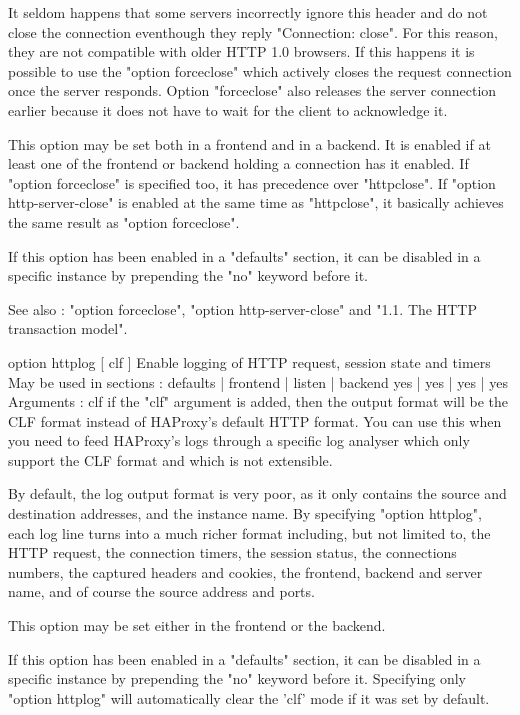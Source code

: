   It seldom happens that some servers incorrectly ignore this header and do not
  close the connection eventhough they reply "Connection: close". For this
  reason, they are not compatible with older HTTP 1.0 browsers. If this happens
  it is possible to use the "option forceclose" which actively closes the
  request connection once the server responds. Option "forceclose" also
  releases the server connection earlier because it does not have to wait for
  the client to acknowledge it.

  This option may be set both in a frontend and in a backend. It is enabled if
  at least one of the frontend or backend holding a connection has it enabled.
  If "option forceclose" is specified too, it has precedence over "httpclose".
  If "option http-server-close" is enabled at the same time as "httpclose", it
  basically achieves the same result as "option forceclose".

  If this option has been enabled in a "defaults" section, it can be disabled
  in a specific instance by prepending the "no" keyword before it.

  See also : "option forceclose", "option http-server-close" and
             "1.1. The HTTP transaction model".


option httplog [ clf ]
  Enable logging of HTTP request, session state and timers
  May be used in sections :   defaults | frontend | listen | backend
                                 yes   |    yes   |   yes  |   yes
  Arguments :
    clf       if the "clf" argument is added, then the output format will be
              the CLF format instead of HAProxy's default HTTP format. You can
              use this when you need to feed HAProxy's logs through a specific
              log analyser which only support the CLF format and which is not
              extensible.

  By default, the log output format is very poor, as it only contains the
  source and destination addresses, and the instance name. By specifying
  "option httplog", each log line turns into a much richer format including,
  but not limited to, the HTTP request, the connection timers, the session
  status, the connections numbers, the captured headers and cookies, the
  frontend, backend and server name, and of course the source address and
  ports.

  This option may be set either in the frontend or the backend.

  If this option has been enabled in a "defaults" section, it can be disabled
  in a specific instance by prepending the "no" keyword before it. Specifying
  only "option httplog" will automatically clear the 'clf' mode if it was set
  by default.

